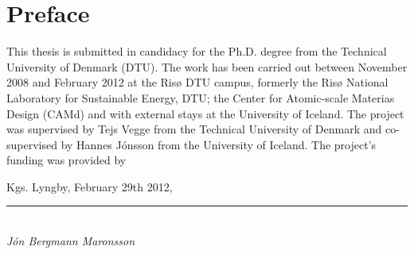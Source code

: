 \section*{Preface}

This thesis is submitted in candidacy for the Ph.D. degree from the Technical University of Denmark (DTU).
The work has been carried out between November 2008 and February 2012 at the Ris\o{} DTU campus, formerly the Ris\o{} National Laboratory for Sustainable Energy, DTU; the Center for Atomic-scale Materias Design (CAMd) and with external stays at the University of Iceland.
The project was supervised by Tejs Vegge from the Technical University of Denmark and co-supervised by Hannes J\'onsson from the University of Iceland.
The project's funding was provided by \expand

\vspace{10mm}
\begin{flushright}
Kgs. Lyngby, February 29th 2012,\\

\vspace{15mm}

\rule{50mm}{0.1pt}\\
\textit{J\'on Bergmann Maronsson}
\end{flushright}
